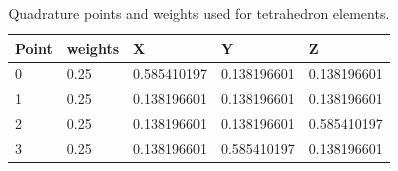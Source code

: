\documentclass[11pt,letterpaper,titlepage]{article}
\numberwithin{equation}{section}
\begin{document}
\begin{appendices}
\begin{table}[H] \label{tbl:qpointstet}
\centering
\begin{tabular}{|l|l|l|l|l|}
\hline
\textbf{Point} & \textbf{weights} & \textbf{X}  & \textbf{Y}  & \textbf{Z}  \\ \hline
0              & 0.25             & 0.585410197 & 0.138196601 & 0.138196601 \\ \hline
1              & 0.25             & 0.138196601 & 0.138196601 & 0.138196601 \\ \hline
2              & 0.25             & 0.138196601 & 0.138196601 & 0.585410197 \\ \hline
3              & 0.25             & 0.138196601 & 0.585410197 & 0.138196601 \\ \hline
\end{tabular}
\caption{Quadrature points and weights used for tetrahedron elements.}
\end{table}

\end{appendices}
\end{document}
